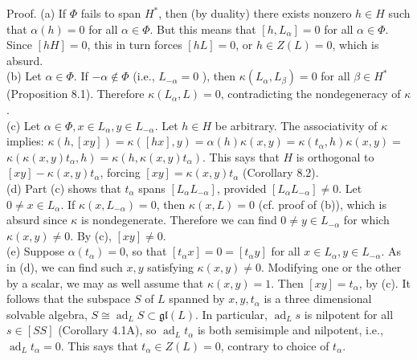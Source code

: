 \documentclass[10pt]{article}
\begin{document}
Proof. (a) If $\Phi$ fails to span $H^{*}$, then (by duality) there exists nonzero $h \in H$ such that $\alpha(h)=0$ for all $\alpha \in \Phi$. But this means that $\left[h, L_{\alpha}\right]=0$ for all $\alpha \in \Phi$. Since $[h H]=0$, this in turn forces $[h L]=0$, or $h \in Z(L)=0$, which is absurd.\\
(b) Let $\alpha \in \Phi$. If $-\alpha \notin \Phi$ (i.e., $L_{-\alpha}=0$ ), then $\kappa\left(L_{\alpha}, L_{\beta}\right)=0$ for all $\beta \in H^{*}$ (Proposition 8.1). Therefore $\kappa\left(L_{\alpha}, L\right)=0$, contradicting the nondegeneracy of $\kappa$.\\
(c) Let $\alpha \in \Phi, x \in L_{\alpha}, y \in L_{-\alpha}$. Let $h \in H$ be arbitrary. The associativity of $\kappa$ implies: $\kappa(h,[x y])=\kappa([h x], y)=\alpha(h) \kappa(x, y)=\kappa\left(t_{\alpha}, h\right) \kappa(x, y)=$\\
$\kappa\left(\kappa(x, y) t_{\alpha}, h\right)=\kappa\left(h, \kappa(x, y) t_{\alpha}\right)$. This says that $H$ is orthogonal to $[x y]-\kappa(x, y) t_{\alpha}$, forcing $[x y]=\kappa(x, y) t_{\alpha}$ (Corollary 8.2).\\
(d) Part (c) shows that $t_{\alpha}$ spans $\left[L_{\alpha} L_{-\alpha}\right]$, provided $\left[L_{\alpha} L_{-\alpha}\right] \neq 0$. Let $0 \neq x \in L_{\alpha}$. If $\kappa\left(x, L_{-\alpha}\right)=0$, then $\kappa(x, L)=0$ (cf. proof of (b)), which is absurd since $\kappa$ is nondegenerate. Therefore we can find $0 \neq y \in L_{-\alpha}$ for which $\kappa(x, y) \neq 0$. By (c), $[x y] \neq 0$.\\
(e) Suppose $\alpha\left(t_{\alpha}\right)=0$, so that $\left[t_{\alpha} x\right]=0=\left[t_{\alpha} y\right]$ for all $x \in L_{\alpha}, y \in L_{-\alpha}$. As in (d), we can find such $x, y$ satisfying $\kappa(x, y) \neq 0$. Modifying one or the other by a scalar, we may as well assume that $\kappa(x, y)=1$. Then $[x y]=t_{\alpha}$, by (c). It follows that the subspace $S$ of $L$ spanned by $x, y, t_{\alpha}$ is a three dimensional solvable algebra, $S \cong \operatorname{ad}_{L} S \subset \mathfrak{g l}(L)$. In particular, $\operatorname{ad}_{L} s$ is nilpotent for all $s \in[S S]$ (Corollary 4.1A), so $\operatorname{ad}_{L} t_{\alpha}$ is both semisimple and nilpotent, i.e., $\operatorname{ad}_{L} t_{\alpha}=0$. This says that $t_{\alpha} \in Z(L)=0$, contrary to choice of $t_{\alpha}$.\\
\end{document}
